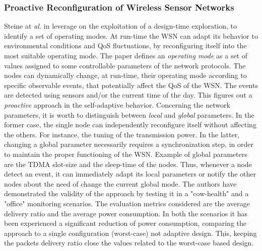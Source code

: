 \subsubsection{Proactive Reconfiguration of Wireless Sensor Networks}
\label {ssec:proactive}

Steine at \emph{al.} in \cite{sys:proactive} leverage on the exploitation of a
design-time exploration, to identify a set of operating modes. At run-time the
WSN can adapt its behavior to environmental conditions and QoS fluctuations,
by reconfiguring itself into the most suitable operating mode.  The paper
defines an \emph{operating mode} as a set of values assigned to some
controllable parameters of the network protocols.
The nodes can dynamically change, at run-time, their operating mode according to
specific observable events, that potentially affect the QoS of the WSN. The
events are detected using sensors and/or the current time of the day. This
figures out a \emph{proactive} approach in the self-adaptive behavior.
Concerning the network parameters, it is worth to distinguish between
\emph{local} and \emph{global} parameters. In the former case, the single node
can independently reconfigure itself without affecting the others. For instance,
the tuning of the transmission power. In the latter, changing a global parameter
necessarily requires a synchronization step, in order to maintain the proper
functioning of the WSN. Example of global parameters are the TDMA slot-size and
the sleep-time of the nodes.
Thus, whenever a node detect an event, it can immediately adapt its local
parameters or notify the other nodes about the need of change the current global
mode.
The authors have demonstrated the validity of the approach by testing it in a
"cow-health" and a "office" monitoring scenarios. The evaluation metrics
considered are the average delivery ratio and the average power consumption. In
both the scenarios it has been experienced a significant reduction of power
consumption, comparing the approach to a single configuration (worst-case) not
adaptive design. This, keeping the packets delivery ratio close the values
related to the worst-case based design.

